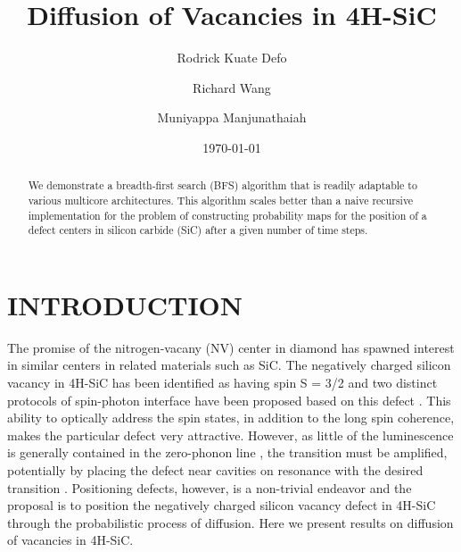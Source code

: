 \documentclass[aps,prb,preprint,superscriptaddress]{revtex4-1}
\begin{document}
\title{Diffusion of Vacancies in 4H-SiC}%

\author{Rodrick Kuate Defo}
\author{Richard Wang}
\author{Muniyappa Manjunathaiah}

\date{\today}%
\begin{abstract}
We demonstrate a breadth-first search (BFS) algorithm that is readily adaptable to various multicore architectures. This algorithm scales better than a naive recursive implementation for the problem of constructing probability maps for the position of a defect centers in silicon carbide (SiC) after a given number of time steps.
\end{abstract}
\maketitle


\section{\label{intro}INTRODUCTION}
The promise of the nitrogen-vacany (NV) center in diamond has spawned interest in similar centers in related materials such as SiC. The negatively charged silicon vacancy in 4H-SiC has been identified as having spin S = 3/2 \cite{Kraus} and two distinct protocols of spin-photon interface have been proposed based on this defect \cite{Soykal}. This ability to optically address the spin states, in addition to the long spin coherence, makes the particular defect very attractive. However, as little of the luminescence is generally contained in the zero-phonon line \cite{Aharonovich}, the transition must be amplified, potentially by placing the defect near cavities on resonance with the desired transition \cite{Bracher}. Positioning defects, however, is a non-trivial endeavor and the proposal is to position the negatively charged silicon vacancy defect in 4H-SiC through the probabilistic process of diffusion. Here we present results on diffusion of vacancies in 4H-SiC. 
\end{document}
